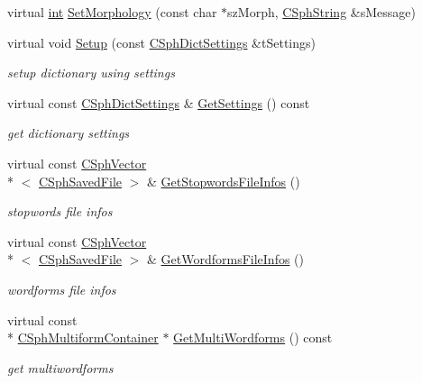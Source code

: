 \begin{DoxyCompactItemize}
virtual \hyperlink{sphinxexpr_8cpp_a4a26e8f9cb8b736e0c4cbf4d16de985e}{int} \hyperlink{classCRtDictKeywords_a6cb6e979de55b2bfa1bdf3f1748aa7b5}{Set\-Morphology} (const char $\ast$sz\-Morph, \hyperlink{structCSphString}{C\-Sph\-String} \&s\-Message)
\item 
virtual void \hyperlink{classCRtDictKeywords_aa793d001c7a891b40fe09bf7eb8a6a0d}{Setup} (const \hyperlink{structCSphDictSettings}{C\-Sph\-Dict\-Settings} \&t\-Settings)
\begin{DoxyCompactList}\small\item\em setup dictionary using settings \end{DoxyCompactList}\item 
virtual const \hyperlink{structCSphDictSettings}{C\-Sph\-Dict\-Settings} \& \hyperlink{classCRtDictKeywords_ab17872be1411e0b55ab57ea9cc0217e9}{Get\-Settings} () const 
\begin{DoxyCompactList}\small\item\em get dictionary settings \end{DoxyCompactList}\item 
virtual const \hyperlink{classCSphVector}{C\-Sph\-Vector}\\*
$<$ \hyperlink{structCSphSavedFile}{C\-Sph\-Saved\-File} $>$ \& \hyperlink{classCRtDictKeywords_a9264e747ae01ed222824d84051ea6a3b}{Get\-Stopwords\-File\-Infos} ()
\begin{DoxyCompactList}\small\item\em stopwords file infos \end{DoxyCompactList}\item 
virtual const \hyperlink{classCSphVector}{C\-Sph\-Vector}\\*
$<$ \hyperlink{structCSphSavedFile}{C\-Sph\-Saved\-File} $>$ \& \hyperlink{classCRtDictKeywords_a6f790224a4e7b98528e6405d9d8c4f51}{Get\-Wordforms\-File\-Infos} ()
\begin{DoxyCompactList}\small\item\em wordforms file infos \end{DoxyCompactList}\item 
virtual const \\*
\hyperlink{structCSphMultiformContainer}{C\-Sph\-Multiform\-Container} $\ast$ \hyperlink{classCRtDictKeywords_aabf7d5fb0de296bb8d63746bc2721818}{Get\-Multi\-Wordforms} () const 
\begin{DoxyCompactList}\small\item\em get multiwordforms \end{DoxyCompactList}\item 

\end{DoxyCompactItemize}
